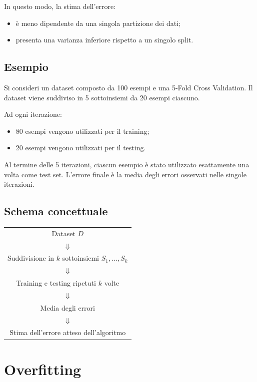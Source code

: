 \documentclass[a4paper,12pt]{report}
\begin{document}
In questo modo, la stima dell’errore:
\begin{itemize}
    \item è meno dipendente da una singola partizione dei dati;
    \item presenta una varianza inferiore rispetto a un singolo split.
\end{itemize}

\subsection*{Esempio}

Si consideri un dataset composto da 100 esempi e una 5-Fold Cross Validation.
Il dataset viene suddiviso in 5 sottoinsiemi da 20 esempi ciascuno.

Ad ogni iterazione:
\begin{itemize}
    \item 80 esempi vengono utilizzati per il training;
    \item 20 esempi vengono utilizzati per il testing.
\end{itemize}

Al termine delle 5 iterazioni, ciascun esempio è stato utilizzato esattamente una volta come test set.
L’errore finale è la media degli errori osservati nelle singole iterazioni.

\subsection*{Schema concettuale}

\begin{center}
\begin{tabular}{c}
Dataset \( D \) \\
\(\Downarrow\) \\
Suddivisione in \( k \) sottoinsiemi \( S_1, \dots, S_k \) \\
\(\Downarrow\) \\
Training e testing ripetuti \( k \) volte \\
\(\Downarrow\) \\
Media degli errori \\
\(\Downarrow\) \\
Stima dell’errore atteso dell’algoritmo
\end{tabular}
\end{center}


\section{Overfitting}
\end{document}
